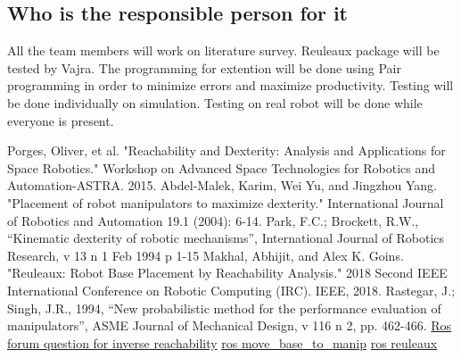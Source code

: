 \documentclass[12pt]{article}
\begin{document}
\subsection{Who is the responsible person for it}
All the team members will work on literature survey. Reuleaux package will be tested by Vajra. The programming for extention will be done using Pair programming in order to minimize errors and maximize productivity. Testing will be done individually on simulation. Testing on real robot will be done while everyone is present.
\begin{thebibliography}{1}
        Porges, Oliver, et al. "Reachability and Dexterity: Analysis and Applications for Space Robotics." Workshop on Advanced Space Technologies for Robotics and Automation-ASTRA. 2015.
        Abdel-Malek, Karim, Wei Yu, and Jingzhou Yang. "Placement of robot manipulators to maximize dexterity." International Journal of Robotics and Automation 19.1 (2004): 6-14.
        Park, F.C.; Brockett, R.W., “Kinematic dexterity of robotic mechanisms”, International
Journal of Robotics Research, v 13 n 1 Feb 1994 p 1-15
Makhal, Abhijit, and Alex K. Goins. "Reuleaux: Robot Base Placement by Reachability Analysis." 2018 Second IEEE International Conference on Robotic Computing (IRC). IEEE, 2018.
Rastegar, J.; Singh, J.R., 1994, “New probabilistic method for the performance evaluation
of manipulators”, ASME Journal of Mechanical Design, v 116 n 2, pp. 462-466.
\href{https://answers.ros.org/question/261304/what-packages-apart-from-reuleaux-can-be-used-for-optimal-base-positioning-of-a-robot-for-mobile-manipulation/}{Ros forum question for inverse reachability} 
\href{http://wiki.ros.org/move_base_to_manip}{ros move\_base\_to\_manip}
\href{http://wiki.ros.org/reuleaux}{ros reuleaux}
\end{thebibliography}
\end{document}
